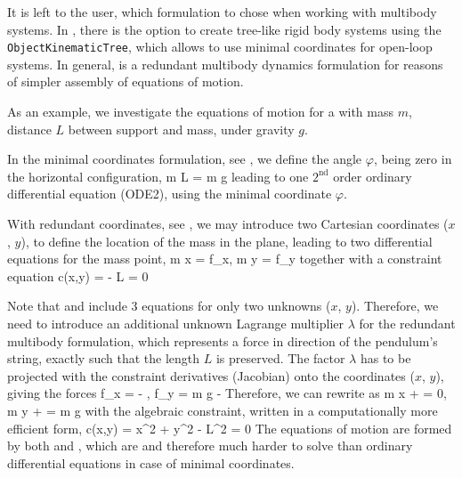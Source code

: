 \noindent It is left to the user, which formulation to chose when working with multibody systems. 
In \codeName, there is the option to create tree-like rigid body systems
using the \texttt{ObjectKinematicTree}, which allows to use minimal coordinates for open-loop systems. In general, \codeName is a redundant 
multibody dynamics formulation for reasons of simpler assembly of equations of motion.

\noindent As an example, we investigate the equations of motion for a  with mass $m$, distance $L$ between support and mass,
under gravity $g$.

\noindent In the minimal coordinates formulation, see , we define the angle $\varphi$, being zero in the horizontal configuration,
\be
  m L \ddot \varphi = m g \cos \varphi
\ee
leading to one $2^\mathrm{nd}$ order ordinary differential equation (ODE2), using the minimal coordinate $\varphi$.

\noindent With redundant coordinates, see , we may introduce two Cartesian coordinates ($x$, $y$), to define the location of the mass in 
the plane, leading to two differential equations for the mass point,
\be \label{eq:theory:pendulum:redundantCoords}
  m \ddot x = f_x, \quad
  m \ddot y = f_y
\ee
together with a constraint equation 
\be \label{eq:theory:pendulum:redundantConstraint}
	c(x,y) =  - L = 0
\ee
{}

\noindent Note that  and  include 3 equations for only two unknowns ($x$, $y$). 
Therefore, we need to introduce an additional unknown Lagrange multiplier $\lambda$ for the redundant multibody formulation,
which represents a force in direction of the pendulum's string, exactly such that the length $L$ is preserved.
The factor $\lambda$ has to be projected with the constraint derivatives (Jacobian) onto the coordinates ($x$, $y$), giving the forces
\be
  f_x = - \lambda, \quad
  f_y = m g -  \lambda \eqDot
\ee
Therefore, we can rewrite  as
\be \label{eq:theory:pendulum:redundantFinal}
  m \ddot x +  \lambda = 0, \quad
  m \ddot y +  \lambda = m g
\ee
with the algebraic constraint, written in a computationally more efficient form,
\be \label{eq:theory:pendulum:redundantConstraintFinal}
  c(x,y) = x^2 + y^2 - L^2 = 0
\ee
The equations of motion are formed by both  and ,
which are  and therefore much harder to solve than ordinary differential equations
in case of minimal coordinates.

